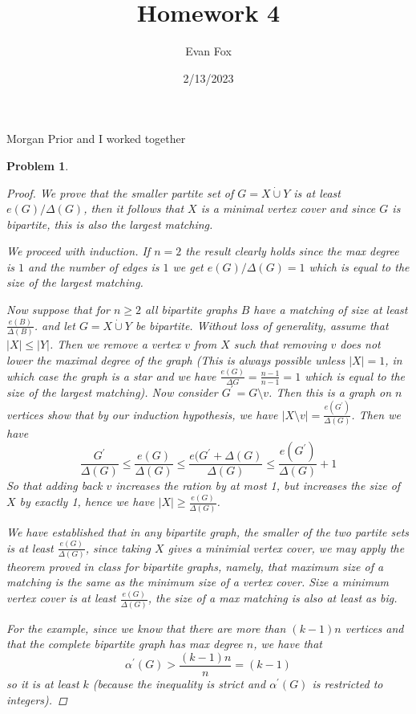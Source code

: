 \documentclass{article}
\title{Homework 4}
\author{Evan Fox}
\date{2/13/2023}
\newtheorem{prb}{Problem}
\begin{document}
 
\maketitle
Morgan Prior and I worked together
\begin{prb} 
	\begin{proof} 
	We prove that the smaller partite set of $G = X \dot{\cup} Y$ is at least $e(G) / \Delta(G)$, then it follows that $X$ is a minimal 
	vertex cover and since $G$ is bipartite, this is also the largest matching. 

	We proceed with induction. If $n =2$ the result clearly holds since the max degree is $1$ and the number of edges is $1$ we get 
	$e(G)/\Delta(G) = 1$ which is equal to the size of the largest matching. 

	Now suppose that for $n \geq 2$ all bipartite graphs $B$ have a matching of size at least $\frac{e(B)}{\Delta(B)}$. and let 
	$G = X \dot{\cup} Y$ be bipartite. Without loss of generality, assume that $|X| \leq |Y|$. Then we remove a vertex $v$ from 
	$X$ such that removing $v$ does not lower the maximal degree of the graph (This is always possible unless $|X| = 1$, in which 
case the graph is a star and we have $\frac{e(G)}{\Delta{G}} = \frac{n-1}{n-1} = 1$ which is equal to the size of the largest matching). 
	Now consider $G^\prime = G \setminus v$. Then this is a graph on $n$ vertices show that by our induction hypothesis, we have 
	$|X \setminus v| = \frac{e(G^\prime)}{\Delta(G)}$. Then we have 
	\[ \frac{G^\prime}{\Delta(G)} \leq \frac{e(G)}{\Delta(G)} \leq \frac{e(G^\prime + \Delta(G)}{\Delta(G)} \leq \frac{e(G^\prime)}{\Delta(G)} + 1 \] 
	So that adding back $v$ increases the ration by at most 1, but increases the size of $X$ by exactly 1, hence we have $|X| \geq \frac{e(G)}{\Delta(G)}$. 
	
	We have established that in any bipartite graph, the smaller of the two partite sets is at least $\frac{e(G)}{\Delta(G)}$, since taking 
	$X$ gives a minimial vertex cover, we may apply the theorem proved in class for bipartite graphs, namely, that maximum size of a matching 
	is the same as the minimum size of a vertex cover. Size a minimum vertex cover is at least $\frac{e(G)}{\Delta(G)}$, the size of a max matching is 
	also at least as big. 

	For the example, since we know that there are more than $(k-1)n$ vertices and that the complete bipartite graph has max degree $n$, we have that 
	\[ \alpha^\prime(G) > \frac{(k-1)n}{n} = (k-1) \] 
	so it is at least $k$ (because the inequality is strict and $\alpha^\prime(G)$ is restricted to integers). 
	\end{proof} 
\end{prb}
\end{document}
